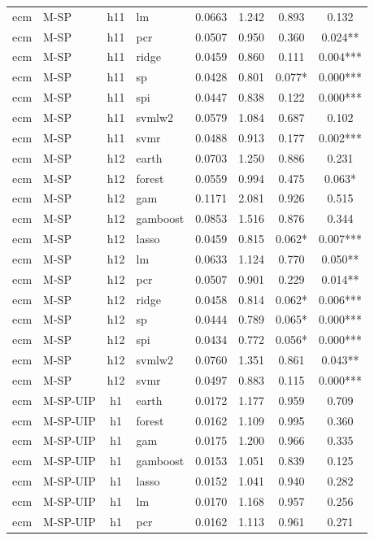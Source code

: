 \begin{ThreePartTable}
\begin{longtable}[t]{llclcccc}
ecm & M-SP & h11 & lm & 0.0663 & 1.242 & 0.893 & 0.132\\
ecm & M-SP & h11 & pcr & 0.0507 & 0.950 & 0.360 & 0.024**\\
ecm & M-SP & h11 & ridge & 0.0459 & 0.860 & 0.111 & 0.004***\\
ecm & M-SP & h11 & sp & 0.0428 & 0.801 & 0.077* & 0.000***\\
ecm & M-SP & h11 & spi & 0.0447 & 0.838 & 0.122 & 0.000***\\
ecm & M-SP & h11 & svmlw2 & 0.0579 & 1.084 & 0.687 & 0.102\\
ecm & M-SP & h11 & svmr & 0.0488 & 0.913 & 0.177 & 0.002***\\
\addlinespace
ecm & M-SP & h12 & earth & 0.0703 & 1.250 & 0.886 & 0.231\\
ecm & M-SP & h12 & forest & 0.0559 & 0.994 & 0.475 & 0.063*\\
ecm & M-SP & h12 & gam & 0.1171 & 2.081 & 0.926 & 0.515\\
ecm & M-SP & h12 & gamboost & 0.0853 & 1.516 & 0.876 & 0.344\\
ecm & M-SP & h12 & lasso & 0.0459 & 0.815 & 0.062* & 0.007***\\
ecm & M-SP & h12 & lm & 0.0633 & 1.124 & 0.770 & 0.050**\\
ecm & M-SP & h12 & pcr & 0.0507 & 0.901 & 0.229 & 0.014**\\
ecm & M-SP & h12 & ridge & 0.0458 & 0.814 & 0.062* & 0.006***\\
ecm & M-SP & h12 & sp & 0.0444 & 0.789 & 0.065* & 0.000***\\
ecm & M-SP & h12 & spi & 0.0434 & 0.772 & 0.056* & 0.000***\\
ecm & M-SP & h12 & svmlw2 & 0.0760 & 1.351 & 0.861 & 0.043**\\
ecm & M-SP & h12 & svmr & 0.0497 & 0.883 & 0.115 & 0.000***\\
\addlinespace
ecm & M-SP-UIP & h1 & earth & 0.0172 & 1.177 & 0.959 & 0.709\\
ecm & M-SP-UIP & h1 & forest & 0.0162 & 1.109 & 0.995 & 0.360\\
ecm & M-SP-UIP & h1 & gam & 0.0175 & 1.200 & 0.966 & 0.335\\
ecm & M-SP-UIP & h1 & gamboost & 0.0153 & 1.051 & 0.839 & 0.125\\
ecm & M-SP-UIP & h1 & lasso & 0.0152 & 1.041 & 0.940 & 0.282\\
ecm & M-SP-UIP & h1 & lm & 0.0170 & 1.168 & 0.957 & 0.256\\
ecm & M-SP-UIP & h1 & pcr & 0.0162 & 1.113 & 0.961 & 0.271\\

\end{longtable}
\end{ThreePartTable}
